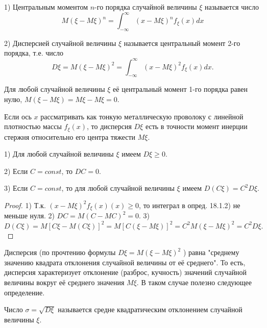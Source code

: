 \begin{definition}
1) Центральным моментом $n$-го порядка случайной
величины $\xi$ называется число
\begin{equation}
M(\xi − M\xi)^n = \int_{-\infty}^{\infty}(x-M\xi)^n f_{\xi}(x)dx
\end{equation}

2) Дисперсией случайной величины $\xi$ называется центральный момент 2-го порядка, т.е. число
\begin{equation}
D\xi = M(\xi − M\xi)^2 = \int_{-\infty}^{\infty}(x-M\xi)^2 f_{\xi}(x)dx.
\end{equation}
\end{definition}

\begin{zam}
Для любой случайной величины $\xi$ её центральный момент 1-го порядка равен нулю, $M(\xi − M\xi) = M\xi − M\xi = 0$.
\end{zam}

\begin{zam}
Если ось $x$ рассматривать как тонкую металлическую проволоку с линейной плотностью массы $f_{\xi}(x)$, то дисперсия $D\xi$ есть в точности момент инерции стержня относительно его центра тяжести $M\xi$.
\end{zam}

\begin{lemma}
1) Для любой случайной величины $\xi$ имеем $D\xi \geq 0$.

2) Если $C = const$, то $DC = 0$.

3) Если $C = const$, то для любой случайной величины $\xi$ имеем $D(C\xi) = C^2D\xi.$
\end{lemma}
 
\begin{proof}
1) Т.к. $(x − M\xi)^2 f_{\xi}(x) (x) \geq 0$, то интеграл в опред. 18.1.2) не меньше нуля.
2) $DC = M(C − MC)^2 = 0$.
3) $D(C\xi) = M[C\xi −M(C\xi)]^2 = M[C(\xi −M\xi)]^2 = C^2M(\xi − M\xi)^2 = C^2D\xi.$
\end{proof}

\begin{zam}
Дисперсия (по прочтению формулы $D\xi = M(\xi − M\xi)^2$ )
равна "среднему значению квадрата отклонения случайной величины от её среднего". То есть, дисперсия характеризует отклонение (разброс, кучность) значений случайной величины вокруг её среднего значения $M\xi$.
В таком случае полезно следующее определение.	
\end{zam}

\begin{definition}
Число $\sigma = \sqrt{D\xi}$ называется средне квадратическим отклонением случайной величины $\xi$.	
\end{definition}

